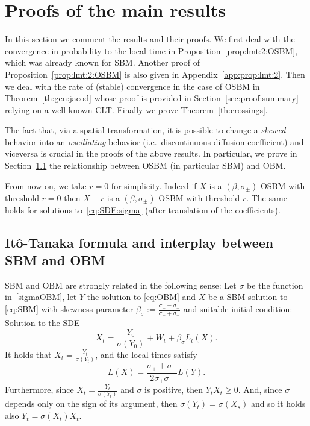\documentclass[12pt]{article}
\numberwithin{equation}{section}
\theoremstyle{definition}
\theoremstyle{remark}
\begin{document}
\section{Proofs of the main results} \label{sec:proofs}

In this section we comment the results and their proofs. 
We first deal with the convergence in probability to the local time in Proposition~\ref{prop:lmt:2:OSBM}, which was already known for SBM. Another proof of Proposition~\ref{prop:lmt:2:OSBM} is also given in Appendix~\ref{app:prop:lmt:2}. 
Then we deal with the rate of (stable) convergence in the case of OSBM in Theorem~\ref{th:gen:jacod} whose proof is provided in Section~\ref{sec:proof:summary} relying on a well known CLT. Finally we prove Theorem~\ref{th:crossings}.

The fact that, via a spatial transformation, it is possible to change a {\em skewed\/} behavior into an {\em oscillating\/} behavior (i.e.~discontinuous diffusion coefficient) and viceversa is crucial in the proofs of the above results. 
In particular, we prove in Section~\ref{sec:interplay} the relationship between OSBM (in particular SBM) and OBM.

From now on, we take $r=0$ for simplicity. Indeed if $X$ is a $(\beta,\sigma_\pm)$-OSBM 
with threshold $r=0$ then $X-r$ is a $(\beta,\sigma_\pm)$-OSBM  
with threshold $r$. The same holds for solutions to~\eqref{eq:SDE:sigma} 
(after translation of the coefficients).


\subsection{It\^o-Tanaka formula and interplay between SBM and OBM} \label{sec:interplay}

SBM and OBM are strongly related in the following sense: 
Let $\sigma$ be the function in~\eqref{sigmaOBM}, let $Y$ the solution to \eqref{eq:OBM} and $X$ be a SBM solution to \eqref{eq:SBM} with skewness parameter ${{\beta_\sigma}:=\frac{\sigma_--\sigma_+}{\sigma_-+\sigma_+}}$ and suitable initial condition: 
Solution to the SDE
\begin{equation} \label{eq:SBM:2}
X_t
=\frac{Y_0}{\sigma(Y_0)}+ W_t+ \beta_\sigma L_t(X) .
\end{equation}
It holds that 
$ {  X_t =\frac{Y_t}{\sigma(Y_t)} }$,
and the local times satisfy  
\begin{equation}
    \label{eq:local_time:eq}
    L(X)=\frac{\sigma_++\sigma_-}{2\sigma_+\sigma_-}L(Y).
\end{equation}
Furthermore, since $ { X_t = \frac{Y_t}{\sigma(Y_t)}  }$ and $\sigma$ is positive, then $Y_t X_t \geq 0$. And, since $\sigma$ depends only on the sign of its argument,
then $\sigma(Y_t)=\sigma(X_s)$ and so it holds also ${ Y_t=\sigma(X_t) X_t }$.\\
%
%
%
\end{document}
